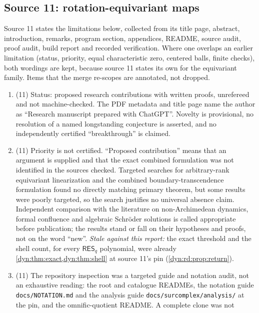 \documentclass[11pt,letterpaper]{article}
\theoremstyle{definition}
\theoremstyle{remark}
\newcommand{\resq}{\mathsf{RES}_q}
\numberwithin{equation}{section}
\begin{document}
\subsection{Source 11: rotation-equivariant maps}
\label{dyn:rd:subsec:nonclaims}
Source 11 states the limitations below, collected from its title page,
abstract, introduction, remarks, program section, appendices, README, source
audit, proof audit, build report and recorded verification. Where one
overlaps an earlier limitation (status, priority, equal characteristic zero,
centered balls, finite checks), both wordings are kept, because source 11
states its own for the equivariant family. Items that the merge re-scopes
are annotated, not dropped.
\begin{enumerate}[label=\textbf{N\arabic*.},ref=\textbf{N\arabic*},leftmargin=3.2em,start=126]
\item\label{dyn:rd:nc:status} (11) Status: proposed research
contributions with written proofs, unrefereed and not machine-checked. The
PDF metadata and title page name the author as ``Research manuscript
prepared with ChatGPT''. Novelty is provisional, no resolution of a named
longstanding conjecture is asserted, and no independently certified
``breakthrough'' is claimed.
\item\label{dyn:rd:nc:priority} (11) Priority is not certified. ``Proposed
contribution'' means that an argument is supplied and that the exact
combined formulation was not identified in the sources checked. Targeted
searches for arbitrary-rank equivariant linearization and the combined
boundary-transcendence formulation found no directly matching primary
theorem, but some results were poorly targeted, so the search justifies no
universal absence claim. Independent comparison with the literature on
non-Archimedean dynamics, formal confluence and algebraic Schr\"oder
solutions is called appropriate before publication; the results stand or
fall on their hypotheses and proofs, not on the word ``new''. \emph{Stale
against this report:} the exact threshold and the shell count, for every
$\resq$ polynomial, were already \cref{dyn:thm:exact,dyn:thm:shell} at
source 11's pin (\cref{dyn:rd:prop:return}).
\item\label{dyn:rd:nc:repo} (11) The repository inspection was a targeted
guide and notation audit, not an exhaustive reading: the root and catalogue
READMEs, the notation guide \texttt{docs/NOTATION.md} and the analysis
guide \texttt{docs/\allowbreak surcomplex/\allowbreak analysis/} at the
pin, and the omnific-quotient README. A complete clone was not

\end{enumerate}
\end{document}
